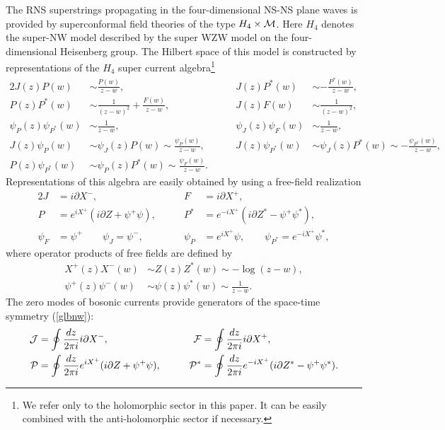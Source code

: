 \documentclass[a4paper,seceq,preprint]{ptptex}
\newcommand{\dz}{\frac{dz}{2\pi i}}
\begin{document}
The RNS superstrings propagating in the four-dimensional
NS-NS plane waves is provided by superconformal 
field theories of the type $H_4\times{\cal M}$.\cite{HS1,HS2} 
Here $H_4$ denotes the super-NW model described by 
the super WZW model on the four-dimensional Heisenberg group. 
The Hilbert space of this model is constructed by representations of 
the $H_4$ super current algebra\footnote{
We refer only to the holomorphic sector in this paper.
It can be easily combined with the anti-holomorphic sector
if necessary.\cite{HS2,KK,KP,MO}}
\begin{alignat}{2}\label{h4sca}
 J(z)P(w)&\sim\frac{P(w)}{z-w},&\qquad
 J(z)P^*(w)&\sim-\frac{P^*(w)}{z-w},\nonumber\\
 P(z)P^*(w)&\sim\frac{1}{(z-w)^2}+\frac{F(w)}{z-w},&\qquad
 J(z)F(w)&\sim\frac{1}{(z-w)^2}, \nonumber\\
  \psi_P(z)\psi_{P^*}(w)&\sim\frac{1}{z-w},&\qquad
 \psi_J(z)\psi_F(w)&\sim\frac{1}{z-w},\nonumber\\
J(z)\psi_P(w)&\sim\psi_J(z)P(w)\sim 
\frac{\psi_P(w)}{z-w},&\qquad
J(z)\psi_{P^*}(w)&\sim\psi_J(z)P^*(w)\sim
-\frac{\psi_{P^*}(w)}{z-w},\nonumber\\
P(z)\psi_{P^*}(w)&\sim\psi_P(z)P^*(w)\sim
\frac{\psi_F(w)}{z-w}.& &
\end{alignat}
Representations of this algebra are easily obtained by using
a free-field realization\cite{KK}
\begin{alignat}{2}
 J&=i\partial X^-,&\qquad F&=i\partial X^+,\nonumber\\
 P&=e^{iX^+}(i\partial Z+\psi^+\psi),&\qquad
 P^*&=e^{-iX^+}(i\partial Z^*-\psi^+\psi^*),\nonumber\\
\psi_F&=\psi^+\qquad
\psi_J=\psi^-,&\qquad
\psi_P&=e^{iX^+}\psi,\qquad
\psi_{P^*}=e^{-iX^+}\psi^*,
\end{alignat}
where operator products of free fields are defined by
\begin{align}
 X^+(z)X^-(w)&\sim Z(z)Z^*(w)\sim -\log(z-w),\nonumber\\
\psi^+(z)\psi^-(w)&\sim\psi(z)\psi^*(w)\sim\frac{1}{z-w}.
\end{align}
The zero modes of bosonic currents provide generators of 
the space-time symmetry (\ref{glbnw}):
 \begin{alignat}{2}
 {\cal J}&=\oint\dz i\partial X^-,&\qquad
 {\cal F}&=\oint\dz i\partial X^+,\nonumber\\
 {\cal P}&=\oint\dz e^{iX^+}(i\partial Z+\psi^+\psi),&\qquad
 {\cal P}^*&=\oint\dz e^{-iX^+}(i\partial Z^*-\psi^+\psi^*).
\label{glbnwgen}
 \end{alignat}
\end{document}
